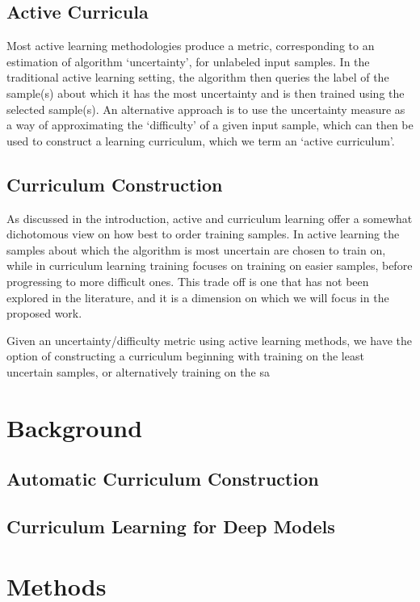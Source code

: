 \documentclass[a4paper,11pt]{article}
\begin{document}
\subsection{Active Curricula}
Most active learning methodologies produce a metric, corresponding to an estimation of algorithm `uncertainty', for unlabeled input samples. In the traditional active learning setting, the algorithm then queries the label of the sample(s) about which it has the most uncertainty and is then trained using the selected sample(s). An alternative approach is to use the uncertainty measure as a way of approximating the `difficulty' of a given input sample, which can then be used to construct a learning curriculum, which we term an `active curriculum'.

\subsection{Curriculum Construction}
As discussed in the introduction, active and curriculum learning offer a somewhat dichotomous view on how best to order training samples. In active learning the samples about which the algorithm is most uncertain are chosen to train on, while in curriculum learning training focuses on training on easier samples, before progressing to more difficult ones. This trade off is one that has not been explored in the literature, and it is a dimension on which we will focus in the proposed work. 

Given an uncertainty/difficulty metric using active learning methods, we have the option of constructing a curriculum beginning with training on the least uncertain samples, or alternatively training on the sa 

\section{Background}
\subsection{Automatic Curriculum Construction}

\subsection{Curriculum Learning for Deep Models}

\section{Methods}
\end{document}
